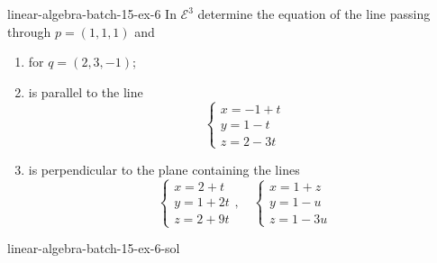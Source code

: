\documentclass[preview]{standalone}
\begin{document}
\begin{snippetexercise}{linear-algebra-batch-15-ex-6}{}
    In \(\mathcal E^3\) determine the equation of the line passing through
    \(p = (1,1,1)\) and
    \begin{enumerate}[label=\Alph*]
        \item for \(q = (2,3,-1)\);
        \item is parallel to the line
        \[
            \begin{cases}
                x = -1 + t \\
                y =1-t \\
                z = 2-3t
            \end{cases}
        \]
        \item is perpendicular to the plane containing the lines
        \[
            \begin{cases}
                x = 2 + t \\
                y = 1 + 2t \\
                z = 2 + 9t
            \end{cases}, \quad
            \begin{cases}
                x = 1 + z \\
                y = 1 - u \\
                z = 1 - 3u
            \end{cases}
        \]
    \end{enumerate}
\end{snippetexercise}

\begin{snippetsolution}{linear-algebra-batch-15-ex-6-sol}{}
    \todo
\end{snippetsolution}
\end{document}
